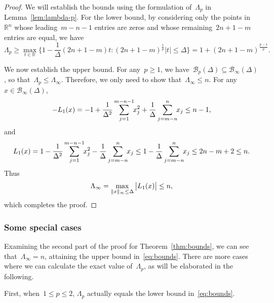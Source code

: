 \documentclass{article}
\numberwithin{equation}{section}
\theoremstyle{definition}
\theoremstyle{plain}
\newtheorem{proposition}{Proposition}[section]
\theoremstyle{remark}
\newcommand*{\abs}[2][]{#1\lvert#2#1\rvert}
\newcommand*{\lagp}[1][]{L\ifblank{#1}{}{_{#1}}}
\newcommand*{\norm}[2][]{#1\lVert#2#1\rVert}
\newcommand*{\R}{\mathbb{R}}
\newcommand*{\set}[2][]{#1\{#2#1\}}
\begin{document}
\begin{proof}
    We will establish the bounds using the formulation of~$\Lambda_p$ in Lemma~\ref{lem:lambda-p}.
    For the lower bound, by considering only the points in~$\R^n$ whose leading~$m - n - 1$ entries are zeros and whose remaining~$2n + 1 - m$ entries are equal, we have
    \begin{equation*}
        \Lambda_p \ge \max_{t \in \R} \set[\bigg]{1 - \frac{1}{\Delta} (2n + 1 - m) t : (2n + 1 - m)^{\frac{1}{p}}\abs{t} \le \Delta} = 1 + (2n + 1 - m)^{\frac{p - 1}{p}}.
    \end{equation*}

    We now establish the upper bound.
    For any~$p \ge 1$, we have~$\mathcal{B}_p(\Delta) \subseteq \mathcal{B}_{\infty}(\Delta)$, so that~$\Lambda_p \le \Lambda_{\infty}$.
    Therefore, we only need to show that~$\Lambda_{\infty} \le n$. For any~$x \in \mathcal{B}_{\infty}(\Delta)$,
    \begin{equation*}
        -\lagp[1](x) = -1 + \frac{1}{\Delta^2} \sum_{j = 1}^{m - n - 1} \!\! x_j^2 + \frac{1}{\Delta} \sum_{j = m - n}^n \!\! x_j \le n-1,
    \end{equation*}
    and
    \begin{equation*}
        \lagp[1](x) = 1 - \frac{1}{\Delta^2} \sum_{j = 1}^{m - n - 1} \!\! x_j^2 - \frac{1}{\Delta} \sum_{j = m - n}^n \!\! x_j
        \le 1 -  \frac{1}{\Delta} \sum_{j = m - n}^n \!\! x_j \le 2n-m+2 \le n.
    \end{equation*}
    Thus
    \begin{equation*}
        \Lambda_{\infty} =
        \max_{\norm{x}_{\infty} \le \Delta} \abs[\big]{\lagp[1](x)} \le n,
    \end{equation*}
    which completes the proof.
\end{proof}

\subsubsection{Some special cases}

Examining the second part of the proof for Theorem~\ref{thm:bounds}, we can see that~$\Lambda_\infty = n$, attaining the upper bound in~\eqref{eq:bounds}.
There are more cases where we can calculate the exact value of~$\Lambda_p$, as will be elaborated in the following.

First, when~$1\le p\le 2$, $\Lambda_p$ actually equals the lower bound in~\eqref{eq:bounds}.

\end{document}
